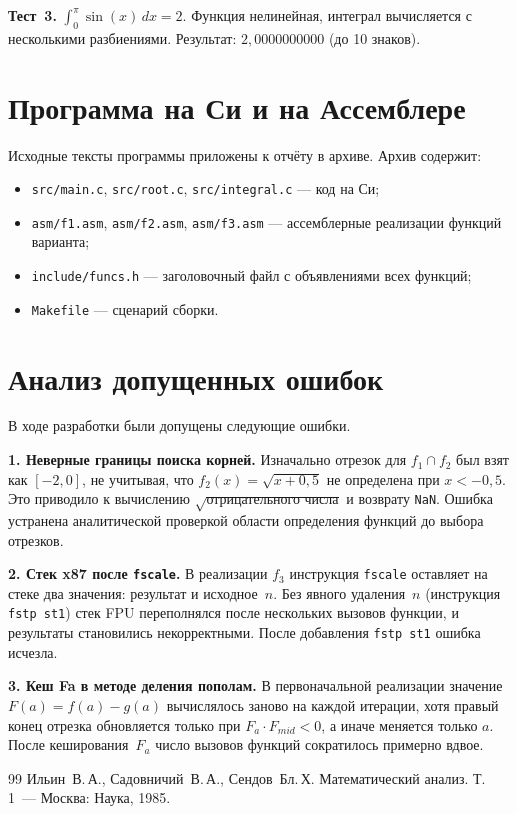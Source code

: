 \documentclass[a4paper,12pt,titlepage,finall]{article}
\begin{document}
\textbf{Тест~3.} $\displaystyle\int_0^\pi \sin(x)\,dx = 2$. Функция нелинейная, интеграл
вычисляется с несколькими разбиениями. Результат: $2{,}0000000000$ (до 10 знаков).

\newpage

\section{Программа на Си и на Ассемблере}

Исходные тексты программы приложены к отчёту в архиве. Архив содержит:
\begin{itemize}
    \item \texttt{src/main.c}, \texttt{src/root.c}, \texttt{src/integral.c} --- код на Си;
    \item \texttt{asm/f1.asm}, \texttt{asm/f2.asm}, \texttt{asm/f3.asm} --- ассемблерные
          реализации функций варианта;
    \item \texttt{include/funcs.h} --- заголовочный файл с объявлениями всех функций;
    \item \texttt{Makefile} --- сценарий сборки.
\end{itemize}

\newpage

\section{Анализ допущенных ошибок}

В ходе разработки были допущены следующие ошибки.

\textbf{1. Неверные границы поиска корней.} Изначально отрезок для $f_1 \cap f_2$ был взят
как $[-2, 0]$, не учитывая, что $f_2(x) = \sqrt{x+0{,}5}$ не определена при $x < -0{,}5$.
Это приводило к вычислению $\sqrt{\text{отрицательного числа}}$ и возврату \texttt{NaN}.
Ошибка устранена аналитической проверкой области определения функций до выбора отрезков.

\textbf{2. Стек x87 после \texttt{fscale}.} В реализации $f_3$ инструкция \texttt{fscale}
оставляет на стеке два значения: результат и исходное~$n$. Без явного удаления~$n$
(инструкция \texttt{fstp st1}) стек FPU переполнялся после нескольких вызовов функции,
и результаты становились некорректными. После добавления \texttt{fstp st1} ошибка исчезла.

\textbf{3. Кеш Fa в методе деления пополам.} В первоначальной реализации значение
$F(a) = f(a) - g(a)$ вычислялось заново на каждой итерации, хотя правый конец отрезка
обновляется только при $F_a \cdot F_{mid} < 0$, а иначе меняется только $a$. После
кеширования~$F_a$ число вызовов функций сократилось примерно вдвое.

\newpage

\begin{raggedright}
\begin{thebibliography}{99}
 Ильин~В.\,А., Садовничий~В.\,А., Сендов~Бл.\,Х.
    Математический анализ. Т.\,1~--- Москва: Наука, 1985.
\end{thebibliography}
\end{raggedright}
\end{document}
